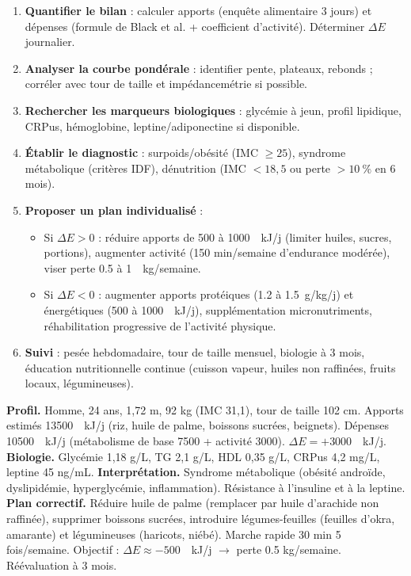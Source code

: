 \documentclass[11pt]{article}
\begin{document}
\begin{methode}
\begin{enumerate}
  \item \textbf{Quantifier le bilan} : calculer apports (enquête alimentaire 3 jours) et dépenses (formule de Black et al. + coefficient d'activité). Déterminer $\Delta E$ journalier.
  \item \textbf{Analyser la courbe pondérale} : identifier pente, plateaux, rebonds ; corréler avec tour de taille et impédancemétrie si possible.
  \item \textbf{Rechercher les marqueurs biologiques} : glycémie à jeun, profil lipidique, CRPus, hémoglobine, leptine/adiponectine si disponible.
  \item \textbf{Établir le diagnostic} : surpoids/obésité (IMC $\ge 25$), syndrome métabolique (critères IDF), dénutrition (IMC $< 18,5$ ou perte $> 10~\%$ en 6 mois).
  \item \textbf{Proposer un plan individualisé} :
        \begin{itemize}
          \item Si $\Delta E > 0$ : réduire apports de \num{500} à \num{1000}~\SI{}{kJ/j} (limiter huiles, sucres, portions), augmenter activité (\num{150} min/semaine d'endurance modérée), viser perte \num{0,5} à \num{1}~\SI{}{kg/semaine}.
          \item Si $\Delta E < 0$ : augmenter apports protéiques (\num{1,2} à \num{1,5}~g/kg/j) et énergétiques (\num{+500} à \num{+1000}~\SI{}{kJ/j}), supplémentation micronutriments, réhabilitation progressive de l'activité physique.
        \end{itemize}
  \item \textbf{Suivi} : pesée hebdomadaire, tour de taille mensuel, biologie à 3 mois, éducation nutritionnelle continue (cuisson vapeur, huiles non raffinées, fruits locaux, légumineuses).
\end{enumerate}
\end{methode}

\begin{exemplebox}
\textbf{Profil.} Homme, 24 ans, 1,72 m, 92 kg (IMC 31,1), tour de taille 102 cm. Apports estimés \num{13500}~\SI{}{kJ/j} (riz, huile de palme, boissons sucrées, beignets). Dépenses \num{10500}~\SI{}{kJ/j} (métabolisme de base \num{7500} + activité \num{3000}). $\Delta E = +3000$~\SI{}{kJ/j}.
\textbf{Biologie.} Glycémie 1,18 g/L, TG 2,1 g/L, HDL 0,35 g/L, CRPus 4,2 mg/L, leptine 45 ng/mL.
\textbf{Interprétation.} Syndrome métabolique (obésité androïde, dyslipidémie, hyperglycémie, inflammation). Résistance à l'insuline et à la leptine.
\textbf{Plan correctif.} Réduire huile de palme (remplacer par huile d'arachide non raffinée), supprimer boissons sucrées, introduire légumes-feuilles (feuilles d'okra, amarante) et légumineuses (haricots, niébé). Marche rapide 30 min 5 fois/semaine. Objectif : $\Delta E \approx -500$~\SI{}{kJ/j} $\rightarrow$ perte \num{0,5} kg/semaine. Réévaluation à 3 mois.
\end{exemplebox}
\end{document}
